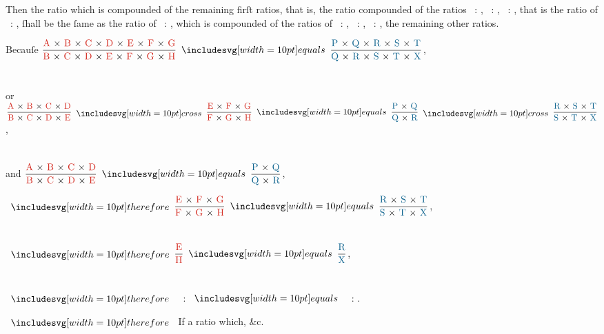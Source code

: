 \documentclass[11pt,preview]{standalone}
\begin{document}
Then the ratio which is compounded of the remaining firſt ratios, that is, the ratio compounded of the ratios \redE\ : \redF, \redF\ : \redG, \redG\ : \redH, that is the ratio of \redE\ : \redH, ſhall be the ſame as the ratio of \blueR\ : \blueX, which is compounded of the ratios of \blueR\ : \blueS, \blueS\ : \blueT, \blueT\ : \blueX, the remaining other ratios.

\begin{center}
    Becauſe $\dfrac{\text{\redA\ × \redB\ × \redC\ × \redD\ × \redE\ × \redF\ × \redG}}{\text{\redB\ × \redC\ × \redD\ × \redE\ × \redF\ × \redG\ × \redH}} \bequals \dfrac{\text{\blueP\ × \blueQ\ × \blueR\ × \blueS\ × \blueT}}{\text{\blueQ\ × \blueR\ × \blueS\ × \blueT\ × \blueX}}$,\\
    \hfill\\
    \hfill\\
    or $\dfrac{\text{\redA\ × \redB\ × \redC\ × \redD}}{\text{\redB\ × \redC\ × \redD\ × \redE}} \bcross \dfrac{\text{\redE\ × \redF\ × \redG}}{\text{\redF\ × \redG\ × \redH}} \bequals \dfrac{\text{\blueP\ × \blueQ}}{\text{\blueQ\ × \blueR}} \bcross \dfrac{\text{\blueR\ × \blueS\ × \blueT}}{\text{\blueS\ × \blueT\ × \blueX}}$,\\
    \hfill\\
    \hfill\\
    and $\dfrac{\text{\redA\ × \redB\ × \redC\ × \redD}}{\text{\redB\ × \redC\ × \redD\ × \redE}} \bequals \dfrac{\text{\blueP\ × \blueQ}}{\text{\blueQ\ × \blueR}}$,\\
\end{center}

\begin{center}
    $\btherefore \dfrac{\text{\redE\ × \redF\ × \redG}}{\text{\redF\ × \redG\ × \redH}} \bequals \dfrac{\text{\blueR\ × \blueS\ × \blueT}}{\text{\blueS\ × \blueT\ × \blueX}}$,\\
    \hfill\\
    \hfill\\
    $\btherefore \dfrac{\text{\redE}}{\text{\redH}} \bequals \dfrac{\text{\blueR}}{\text{\blueX}}$,\\
    \hfill\\
    \hfill\\
    $\btherefore$ \redE\ : \redH $\bequals$ \blueR\ : \blueX.
\end{center}

\hfill

$\btherefore$ If a ratio which, \&c.
\end{document}
